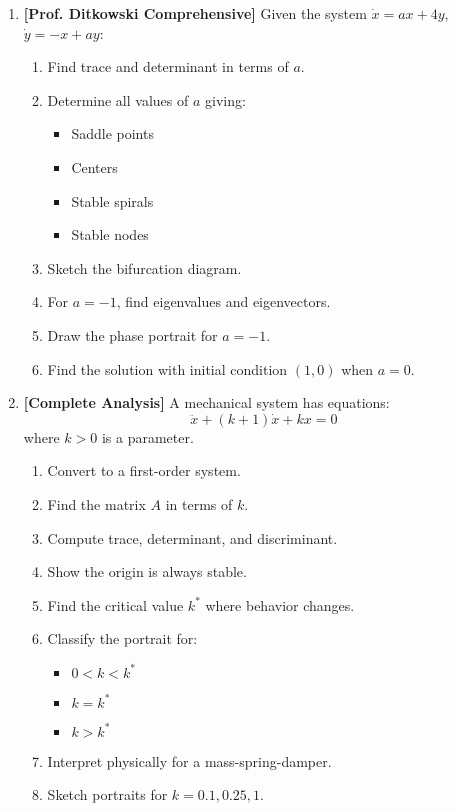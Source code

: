 \documentclass[12pt]{article}
\begin{document}
\begin{enumerate}[resume]
\item \textbf{[Prof. Ditkowski Comprehensive]}
Given the system $\dot{x} = ax + 4y$, $\dot{y} = -x + ay$:
\begin{enumerate}[label=(\alph*)]
    \item Find trace and determinant in terms of $a$.
    \item Determine all values of $a$ giving:
    \begin{itemize}
        \item Saddle points
        \item Centers
        \item Stable spirals
        \item Stable nodes
    \end{itemize}
    \item Sketch the bifurcation diagram.
    \item For $a = -1$, find eigenvalues and eigenvectors.
    \item Draw the phase portrait for $a = -1$.
    \item Find the solution with initial condition $(1, 0)$ when $a = 0$.
\end{enumerate}

\item \textbf{[Complete Analysis]}
A mechanical system has equations:
$$\ddot{x} + (k+1)\dot{x} + kx = 0$$
where $k > 0$ is a parameter.
\begin{enumerate}[label=(\alph*)]
    \item Convert to a first-order system.
    \item Find the matrix $A$ in terms of $k$.
    \item Compute trace, determinant, and discriminant.
    \item Show the origin is always stable.
    \item Find the critical value $k^*$ where behavior changes.
    \item Classify the portrait for:
    \begin{itemize}
        \item $0 < k < k^*$
        \item $k = k^*$
        \item $k > k^*$
    \end{itemize}
    \item Interpret physically for a mass-spring-damper.
    \item Sketch portraits for $k = 0.1, 0.25, 1$.
\end{enumerate}
\end{enumerate}
\end{document}
